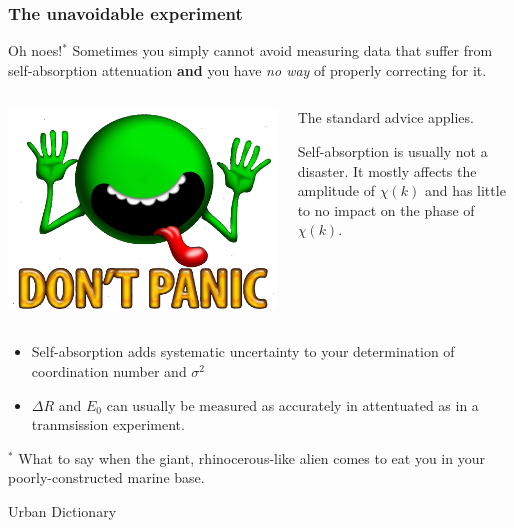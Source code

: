 \documentclass[10pt, xcolor=x11names, compress]{beamer}
\begin{document}
\begin{frame}
  \frametitle{The unavoidable experiment}

  \begin{alertblock}{Oh noes!$^*$}
    Sometimes you simply cannot avoid measuring data that suffer from
    self-absorption attenuation \textbf{and} you have \textit{no way}
    of properly correcting for it.
  \end{alertblock}
  \begin{columns}
    \begin{column}{0.25\linewidth}
      \includegraphics[width=\linewidth]{images/DontPanic.png}      
    \end{column}
    \begin{column}{0.75\linewidth}
      The standard advice applies.
      
      \medskip

      Self-absorption  is usually not a disaster.  It mostly affects
      the amplitude of $\chi(k)$ and has little to no impact on the
      phase of  $\chi(k)$.
    \end{column}
  \end{columns}

  \bigskip

  \begin{itemize}
  \item Self-absorption adds systematic uncertainty to your
    determination of coordination number and $\sigma^2$
  \item $\Delta R$ and $E_0$ can usually be measured as accurately in
    attentuated as in a tranmsission experiment.
  \end{itemize}

  \begin{bottomnote}[0.5][18.75]
    $^*$ What to say when the giant, rhinocerous-like alien comes to eat
    you in your poorly-constructed marine base.

    \vspace{-5ex}

    \begin{flushright}
      Urban Dictionary
    \end{flushright}
  \end{bottomnote}
\end{frame}
\end{document}
